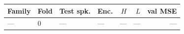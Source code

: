 \begin{tabular}{llllrrr}
\toprule
Family & Fold & Test spk. & Enc. & $H$ & $L$ & val MSE \\
\midrule
--- & 0 & --- & --- & --- & --- & --- \\
\bottomrule
\end{tabular}
